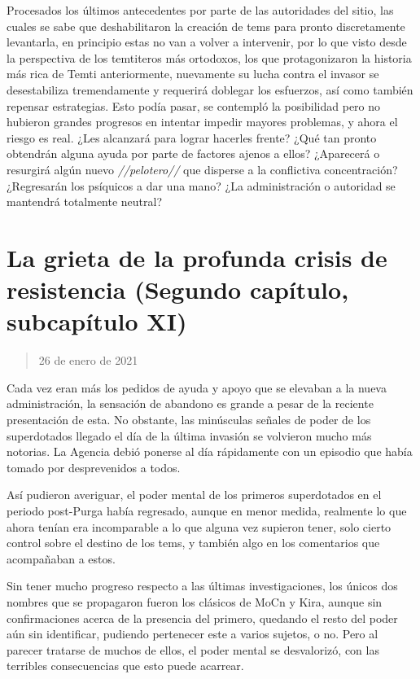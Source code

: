 \documentclass[
  spanish,
]{book}
\begin{document}
Procesados los últimos antecedentes por parte de las autoridades del sitio, las cuales se sabe que deshabilitaron la creación de tems para pronto discretamente levantarla, en principio estas no van a volver a intervenir, por lo que visto desde la perspectiva de los temtiteros más ortodoxos, los que protagonizaron la historia más rica de Temti anteriormente, nuevamente su lucha contra el invasor se desestabiliza tremendamente y requerirá doblegar los esfuerzos, así como también repensar estrategias. Esto podía pasar, se contempló la posibilidad pero no hubieron grandes progresos en intentar impedir mayores problemas, y ahora el riesgo es real. ¿Les alcanzará para lograr hacerles frente? ¿Qué tan pronto obtendrán alguna ayuda por parte de factores ajenos a ellos? ¿Aparecerá o resurgirá algún nuevo \emph{//pelotero//} que disperse a la conflictiva concentración? ¿Regresarán los psíquicos a dar una mano? ¿La administración o autoridad se mantendrá totalmente neutral?

\hypertarget{la-grieta-de-la-profunda-crisis-de-resistencia-segundo-capuxedtulo-subcapuxedtulo-xi}{%
\section{La grieta de la profunda crisis de resistencia (Segundo capítulo, subcapítulo XI)}\label{la-grieta-de-la-profunda-crisis-de-resistencia-segundo-capuxedtulo-subcapuxedtulo-xi}}

\begin{quote}
26 de enero de 2021
\end{quote}

Cada vez eran más los pedidos de ayuda y apoyo que se elevaban a la nueva administración, la sensación de abandono es grande a pesar de la reciente presentación de esta. No obstante, las minúsculas señales de poder de los superdotados llegado el día de la última invasión se volvieron mucho más notorias. La Agencia debió ponerse al día rápidamente con un episodio que había tomado por desprevenidos a todos.

Así pudieron averiguar, el poder mental de los primeros superdotados en el periodo post-Purga había regresado, aunque en menor medida, realmente lo que ahora tenían era incomparable a lo que alguna vez supieron tener, solo cierto control sobre el destino de los tems, y también algo en los comentarios que acompañaban a estos.

Sin tener mucho progreso respecto a las últimas investigaciones, los únicos dos nombres que se propagaron fueron los clásicos de MoCn y Kira, aunque sin confirmaciones acerca de la presencia del primero, quedando el resto del poder aún sin identificar, pudiendo pertenecer este a varios sujetos, o no. Pero al parecer tratarse de muchos de ellos, el poder mental se desvalorizó, con las terribles consecuencias que esto puede acarrear.
\end{document}

